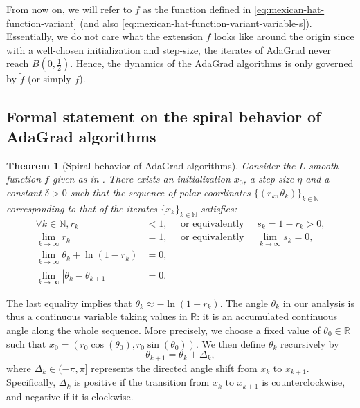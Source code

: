 \documentclass{article}
\theoremstyle{plain}
\newtheorem{theorem}{Theorem}
\theoremstyle{definition}
\theoremstyle{remark}
\newcommand*{\RR}{\mathbb{R}}
\newcommand*{\NN}{\mathbb{N}}
\begin{document}
From now on, we will refer to $f$ as the function defined in \eqref{eq:mexican-hat-function-variant} (and also \eqref{eq:mexican-hat-function-variant-variable-s}). Essentially, we do not care what the extension $f$ looks like around the origin since with a well-chosen initialization and step-size, the iterates of AdaGrad never reach $B\left(0, \frac{1}{2}\right)$. Hence, the dynamics of the AdaGrad algorithms is only governed by $\tilde{f}$ (or simply $f$).

\subsection{Formal statement on the spiral behavior of AdaGrad algorithms}

\begin{theorem}[Spiral behavior of AdaGrad algorithms]
    \label{theorem:sprial-behavior}
    Consider the $L$-smooth function $f$ given as in . There exists an initialization $x_0$, a step size $\eta$ and a constant $\delta > 0$ such that the sequence of polar coordinates $\{(r_k, \theta_k)\}_{k\in\NN}$ corresponding to that of the iterates $\{x_k\}_{k \in \NN}$ satisfies:
    \begin{equation*}
        \begin{aligned}
            \forall k \in \NN, r_k &< 1, \quad \text{ or equivalently } \quad s_k = 1 - r_k > 0,\\
            \lim_{k \to \infty} r_k &= 1, \quad \text{ or equivalently } \quad \lim_{k \to \infty} s_k = 0,\\
            \lim_{k \to \infty} \theta_k + \ln(1 - r_k) &= 0,\\
            \lim_{k \to \infty} |\theta_k - \theta_{k+1}| &= 0.
        \end{aligned}
    \end{equation*}
\end{theorem}

The last equality implies that $\theta_k \approx -\ln (1 - r_k)$. The angle $\theta_k$ in our analysis is thus a continuous variable taking values in $\RR$: it is an accumulated continuous angle along the whole sequence.
More precisely, we choose a fixed value of $\theta_0 \in \RR$ such that $x_0 = (r_0 \cos(\theta_0), r_0 \sin(\theta_0))$. We then define $\theta_k$ recursively by
\begin{equation*}
    \theta_{k+1} = \theta_k + \Delta_k,
\end{equation*}
where $\Delta_k \in (-\pi, \pi]$ represents the directed angle shift from $x_k$ to $x_{k+1}$. Specifically, $\Delta_k$ is positive if the transition from $x_k$ to $x_{k+1}$ is counterclockwise, and negative if it is clockwise.
\end{document}
